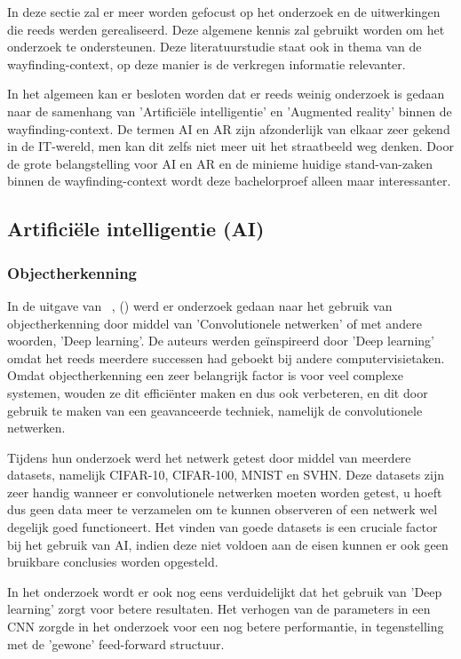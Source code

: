 In deze sectie zal er meer worden gefocust op het onderzoek en de uitwerkingen die reeds werden gerealiseerd. Deze algemene kennis zal gebruikt worden om het onderzoek te ondersteunen. Deze literatuurstudie staat ook in thema van de wayfinding-context, op deze manier is de verkregen informatie relevanter.

In het algemeen kan er besloten worden dat er reeds weinig onderzoek is gedaan naar de samenhang van 'Artificiële intelligentie' en 'Augmented reality' binnen de wayfinding-context. De termen AI en AR zijn afzonderlijk van elkaar zeer gekend in de IT-wereld, men kan dit zelfs niet meer uit het straatbeeld weg denken. Door de grote belangstelling voor AI en AR en de minieme huidige stand-van-zaken binnen de wayfinding-context wordt deze bachelorproef alleen maar interessanter.

\subsection{Artificiële intelligentie (AI)}

\subsubsection{Objectherkenning}
In de uitgave van ~\textcite{Liang2015}, () werd er onderzoek gedaan naar het gebruik van objectherkenning door middel van 'Convolutionele netwerken' of met andere woorden, 'Deep learning'. De auteurs werden geïnspireerd door 'Deep learning' omdat het reeds meerdere successen had geboekt bij andere computervisietaken. Omdat objectherkenning een zeer belangrijk factor is voor veel complexe systemen, wouden ze dit efficiënter maken en dus ook verbeteren, en dit door gebruik te maken van een geavanceerde techniek, namelijk de convolutionele netwerken. 

Tijdens hun onderzoek werd het netwerk getest door middel van meerdere datasets, namelijk CIFAR-10, CIFAR-100, MNIST en SVHN. Deze datasets zijn zeer handig wanneer er convolutionele netwerken moeten worden getest, u hoeft dus geen data meer te verzamelen om te kunnen observeren of een netwerk wel degelijk goed functioneert. Het vinden van goede datasets is een cruciale factor bij het gebruik van AI, indien deze niet voldoen aan de eisen kunnen er ook geen bruikbare conclusies worden opgesteld.

In het onderzoek wordt er ook nog eens verduidelijkt dat het gebruik van 'Deep learning' zorgt voor betere resultaten. Het verhogen van de parameters in een CNN zorgde in het onderzoek voor een nog betere performantie, in tegenstelling met de 'gewone' feed-forward structuur. 

